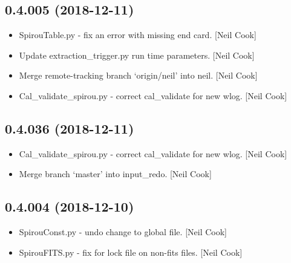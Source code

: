 \documentclass[a4paper,10pt,english]{report}
\begin{document}
\subsection{0.4.005 (2018-12-11)}
\label{\detokenize{misc/changelog:id237}}\begin{itemize}
\item {} 
SpirouTable.py - fix an error with missing end card. {[}Neil Cook{]}

\item {} 
Update extraction\_trigger.py run time parameters. {[}Neil Cook{]}

\item {} 
Merge remote-tracking branch ‘origin/neil’ into neil. {[}Neil Cook{]}

\item {} 
Cal\_validate\_spirou.py - correct cal\_validate for new wlog. {[}Neil
Cook{]}

\end{itemize}


\subsection{0.4.036 (2018-12-11)}
\label{\detokenize{misc/changelog:id238}}\begin{itemize}
\item {} 
Cal\_validate\_spirou.py - correct cal\_validate for new wlog. {[}Neil
Cook{]}

\item {} 
Merge branch ‘master’ into input\_redo. {[}Neil Cook{]}

\end{itemize}


\subsection{0.4.004 (2018-12-10)}
\label{\detokenize{misc/changelog:id239}}\begin{itemize}
\item {} 
SpirouConst.py - undo change to global file. {[}Neil Cook{]}

\item {} 
SpirouFITS.py - fix for lock file on non-fits files. {[}Neil Cook{]}

\end{itemize}
\end{document}
